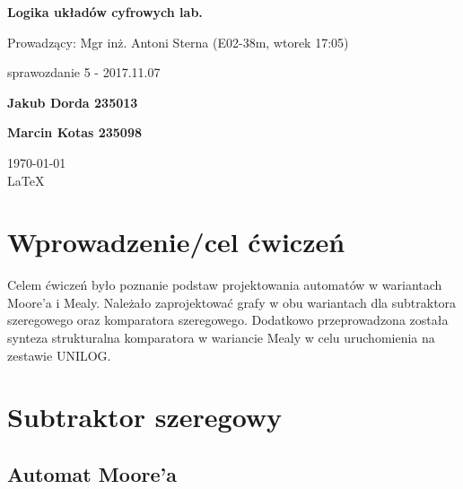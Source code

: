 \documentclass[12pt,a4paper]{article}
\begin{document}
	
	\begin{titlepage}
		
		\centering
		{\huge\bfseries Logika układów cyfrowych lab.\par}
		
		\vspace{0.5cm}
		Prowadzący: Mgr inż. Antoni Sterna (E02-38m, wtorek 17:05) \\
	
		\vspace{1.1cm}
		{\Large sprawozdanie 5 - 2017.11.07\par}
		\vfill
		
		{\large\bfseries Jakub Dorda 235013\par}
		{\large\bfseries Marcin Kotas 235098\par}
		
		\vspace{1cm}
		\today \\ \LaTeX
		
		\restoregeometry
	\end{titlepage}


	\section{Wprowadzenie/cel ćwiczeń}
	
		Celem ćwiczeń było poznanie podstaw projektowania automatów w wariantach Moore'a i Mealy. Należało zaprojektować grafy w obu wariantach dla subtraktora szeregowego oraz komparatora szeregowego. Dodatkowo przeprowadzona została synteza strukturalna komparatora w wariancie Mealy w celu uruchomienia na zestawie UNILOG.
		
		
	\section{Subtraktor szeregowy}
	
		\subsection{Automat Moore'a}
		
\end{document}
